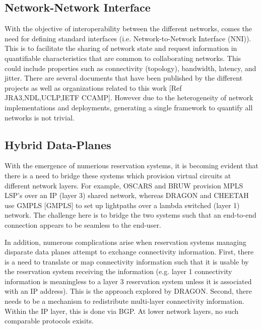 \documentclass[conference]{IEEEtran}
\begin{document}
\subsection{Network-Network Interface}
With the objective of interoperability between the different networks,
comes the need for defining standard interfaces (i.e. Network-to-Network
Interface (NNI)).  This is to facilitate the sharing of network state and
request information in quantifiable characteristics that are common to
collaborating networks.  This could include properties such as connectivity
(topology), bandwidth, latency, and jitter.  There are several documents
that have been published by the different projects as well as organizations
related to this work [Ref JRA3,NDL,UCLP,IETF CCAMP]. However due to the
heterogeneity of network implementations and deployments, generating a single
framework to quantify all networks is not trivial.

\subsection{Hybrid Data-Planes}
With the emergence of numerious reservation systems, it is becoming evident 
that there is a need to bridge these systems which provision virtual circuits 
at different network layers.
For example, OSCARS and BRUW provision MPLS LSP's over an IP (layer 3) shared 
network, whereas DRAGON and CHEETAH use
GMPLS [GMPLS] to set up lightpaths over a lambda switched (layer 1) network.
The challenge here is to bridge the two systems such
that an end-to-end connection appears to be seamless to the end-user.

In addition, numerous complications arise when reservation systems managing 
disparate data planes attempt to exchange connectivity information.  First, 
there is a need to translate or map connectivity information such that it is 
usable by the reservation system receiving the information (e.g. layer 1 
connectivity information is meaningless to a layer 3 reservation system unless 
it is associated with an IP address).  This is the approach explored by DRAGON.
Second, there needs to be a mechanism to redistribute multi-layer connectivity 
information. Within the IP layer, this is done via BGP.  At lower network 
layers, no such comparable protocols exisits.

\end{document}
